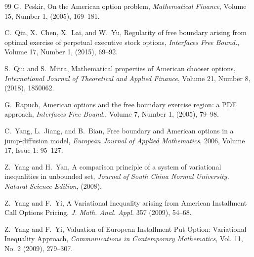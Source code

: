 \documentclass[11pt, a4paper, leqno]{amsart}
\numberwithin{equation}{section}
\theoremstyle{plain}
\theoremstyle{definition}
\theoremstyle{remark}
\begin{document}
\begin{thebibliography}{99}
	G.~Peskir, On the American option problem, \textit{Mathematical Finance}, Volume 15, Number 1, (2005), 169--181.
	
	C.~Qin, X.~Chen, X.~Lai, and W.~Yu, Regularity of free boundary arising from optimal exercise of perpetual executive stock options, \textit{Interfaces Free Bound.}, Volume 17, Number 1, (2015), 69--92.
	
	S.~Qiu and S.~Mitra, Mathematical properties of American chooser options, \textit{International Journal of Theoretical and Applied Finance}, Volume 21, Number 8, (2018), 1850062.
	
	G.~Rapuch, American options and the free boundary exercise region: a PDE approach, \textit{Interfaces Free Bound.}, Volume 7, Number 1, (2005), 79--98.

	
	C.~Yang, L.~Jiang, and B.~Bian, Free boundary and American options in a jump-diffusion model, \textit{European Journal of Applied Mathematics}, 2006, Volume 17, Issue 1: 95--127.
	
	Z.~Yang and H.~Yan, A comparison principle of a system of variational inequalities in unbounded set, \textit{Journal of South China Normal University. Natural Science Edition}, (2008).
	
	Z.~Yang and F.~Yi, A Variational Inequality arising from American Installment Call Options Pricing, \textit{J. Math. Anal. Appl.} 357 (2009), 54--68.
	
	Z.~Yang and F.~Yi, Valuation of European Installment Put Option: Variational Inequality Approach, \textit{Communications in Contemporary Mathematics}, Vol. 11, No. 2 (2009), 279--307.

	
\end{thebibliography}
\end{document}
